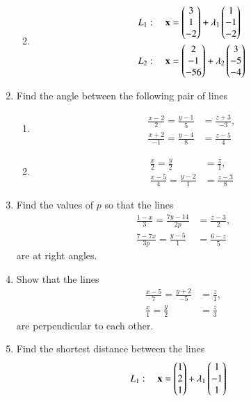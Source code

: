 \begin{enumerate}[label=\arabic*.,ref=\thesubsection.\theenumi]
\begin{enumerate}
\begin{align}
\end{align}
\item
\begin{align}
L_1: \quad \mathbf{x} &= \begin{pmatrix}3\\1\\-2\end{pmatrix} + \lambda_1\begin{pmatrix}1 \\ -1 \\-2\end{pmatrix}
\\
L_2: \quad \mathbf{x} &= \begin{pmatrix}2\\-1\\-56\end{pmatrix} + \lambda_2\begin{pmatrix}3 \\ -5 \\-4\end{pmatrix}
\end{align}
\end{enumerate}
\item Find the angle between the following pair of lines
\begin{enumerate}
\item 
\begin{align}
\frac{x-2}{2} = \frac{y-1}{5} &= \frac{z+3}{-3}, 
\\
\frac{x+2}{-1} = \frac{y-4}{8} &= \frac{z-5}{4} 
\end{align}
\item 
\begin{align}
\frac{x}{2} = \frac{y}{2} &= \frac{z}{1}, 
\\
\frac{x-5}{4} = \frac{y-2}{1} &= \frac{z-3}{8} 
\end{align}
\end{enumerate}
\item Find the values of $p$ so that the lines 
\begin{align}
\frac{1-x}{3} = \frac{7y-14}{2p} &= \frac{z-3}{2}, 
\\
\frac{7-7x}{3p} = \frac{y-5}{1} &= \frac{6-z}{5} 
\end{align}
are at right angles.
\item Show that the lines 
\begin{align}
\frac{x-5}{7} = \frac{y+2}{-5} &= \frac{z}{1}, 
\\
\frac{x}{1} = \frac{y}{2} &= \frac{z}{3} 
\end{align}
%
are perpendicular to each other.
\item Find the shortest distance between the lines 
\begin{align}
L_1: \quad \vec{x} &= \myvec{1\\2\\1} + \lambda_1\myvec{1 \\ -1 \\1}

\end{align}
\end{enumerate}
